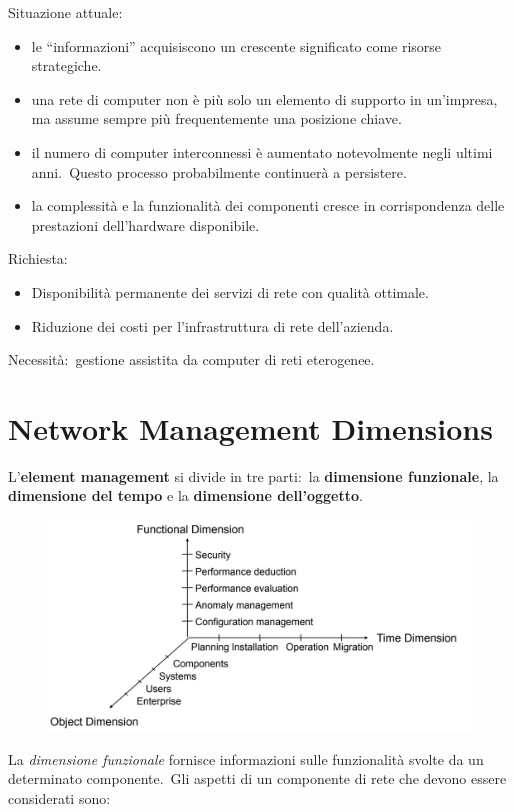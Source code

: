 Situazione attuale:
\begin{itemize}
    \item le ``informazioni'' acquisiscono un crescente significato come risorse strategiche.
    \item una rete di computer non è più solo un elemento di supporto in un'impresa, ma assume sempre più frequentemente una posizione chiave.
    \item il numero di computer interconnessi è aumentato notevolmente negli ultimi anni.\ Questo processo probabilmente continuerà a persistere.
    \item la complessità e la funzionalità dei componenti cresce in corrispondenza delle prestazioni dell'hardware disponibile.
\end{itemize}
Richiesta:
\begin{itemize}
    \item Disponibilità permanente dei servizi di rete con qualità ottimale.
    \item Riduzione dei costi per l'infrastruttura di rete dell'azienda.
\end{itemize}
Necessità:\ gestione assistita da computer di reti eterogenee.

\section{Network Management Dimensions}

L'\textbf{element management} si divide in tre parti:\ la \textbf{dimensione funzionale}, la \textbf{dimensione del tempo} e la \textbf{dimensione dell'oggetto}.\
\begin{figure}[H]
    \centering
    \includegraphics[width=\textwidth]{immagini/NetworkManagementDimension.jpg}
\end{figure}

\noindent La \textit{dimensione funzionale} fornisce informazioni sulle funzionalità svolte da un determinato componente.\
Gli aspetti di un componente di rete che devono essere considerati sono:

